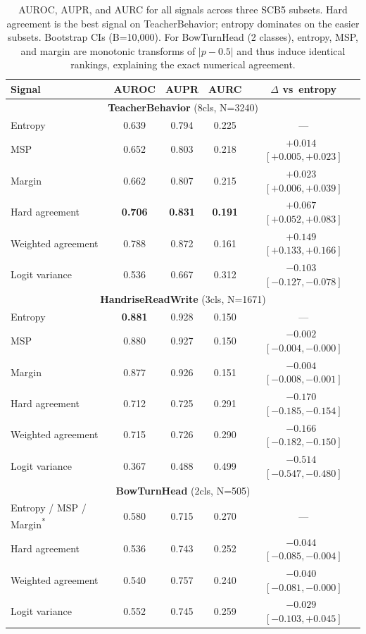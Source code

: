 \documentclass[a4paper,fleqn]{cas-sc}
\newcommand{\scbfive}{\textsc{SCB5}}
\begin{document}
\begin{table}[t]
\centering
\caption{AUROC, AUPR, and AURC for all signals across three \scbfive{} subsets.
Hard agreement is the best signal on TeacherBehavior; entropy dominates on the easier subsets.
Bootstrap CIs (B=10,000).
For BowTurnHead (2 classes), entropy, MSP, and margin are monotonic transforms of $|p-0.5|$ and thus induce identical rankings, explaining the exact numerical agreement.}
\label{tab:main}
\small
\begin{tabular}{lcccc}
\toprule
Signal & AUROC & AUPR & AURC & $\Delta$ vs~entropy \\
\midrule
\multicolumn{5}{c}{\textbf{TeacherBehavior} (8cls, N=3240)} \\
\midrule
Entropy & 0.639 & 0.794 & 0.225 & --- \\
MSP & 0.652 & 0.803 & 0.218 & $+0.014$~$[+0.005,+0.023]$ \\
Margin & 0.662 & 0.807 & 0.215 & $+0.023$~$[+0.006,+0.039]$ \\
Hard agreement & \textbf{0.706} & \textbf{0.831} & \textbf{0.191} & $+0.067$~$[+0.052,+0.083]$ \\
Weighted agreement & 0.788 & 0.872 & 0.161 & $+0.149$~$[+0.133,+0.166]$ \\
Logit variance & 0.536 & 0.667 & 0.312 & $-0.103$~$[-0.127,-0.078]$ \\
\multicolumn{5}{c}{\textbf{HandriseReadWrite} (3cls, N=1671)} \\
\midrule
Entropy & \textbf{0.881} & 0.928 & 0.150 & --- \\
MSP & 0.880 & 0.927 & 0.150 & $-0.002$~$[-0.004,-0.000]$ \\
Margin & 0.877 & 0.926 & 0.151 & $-0.004$~$[-0.008,-0.001]$ \\
Hard agreement & 0.712 & 0.725 & 0.291 & $-0.170$~$[-0.185,-0.154]$ \\
Weighted agreement & 0.715 & 0.726 & 0.290 & $-0.166$~$[-0.182,-0.150]$ \\
Logit variance & 0.367 & 0.488 & 0.499 & $-0.514$~$[-0.547,-0.480]$ \\
\multicolumn{5}{c}{\textbf{BowTurnHead} (2cls, N=505)} \\
\midrule
Entropy / MSP / Margin\textsuperscript{*} & 0.580 & 0.715 & 0.270 & --- \\
Hard agreement & 0.536 & 0.743 & 0.252 & $-0.044$~$[-0.085,-0.004]$ \\
Weighted agreement & 0.540 & 0.757 & 0.240 & $-0.040$~$[-0.081,-0.000]$ \\
Logit variance & 0.552 & 0.745 & 0.259 & $-0.029$~$[-0.103,+0.045]$ \\

\end{tabular}
\end{table}
\end{document}
